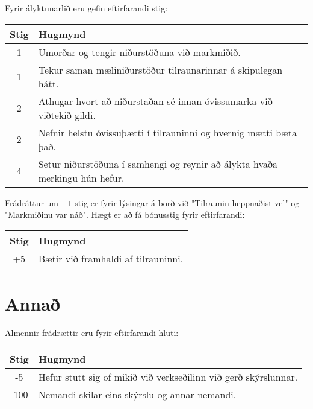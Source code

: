 \begin{tcolorbox}
Fyrir ályktunarlið eru gefin eftirfarandi stig:

\begin{table}[H]
    \centering
    \begin{tabular}{|c|l|}
    \hline
       \textbf{Stig}  & \textbf{Hugmynd}   \\ \hline \hline
        1  &  Umorðar og tengir niðurstöðuna við markmiðið. \\ \hline
        1  & Tekur saman mæliniðurstöður tilraunarinnar á skipulegan hátt. \\ \hline
        2  & Athugar hvort að niðurstaðan sé innan óvissumarka við viðtekið gildi. \\ \hline
        2  & Nefnir helstu óvissuþætti í tilrauninni og hvernig mætti bæta það. \\ \hline
        4 & Setur niðurstöðuna í samhengi og reynir að álykta hvaða merkingu hún hefur. \\ \hline
    \end{tabular}
\end{table}

Frádráttur um $-1$ stig er fyrir lýsingar á borð við "Tilraunin heppnaðist vel" og "Markmiðinu var náð". Hægt er að fá bónusstig fyrir eftirfarandi:

\begin{table}[H]
    \centering
    \begin{tabular}{|c|l|}
    \hline
       \textbf{Stig}  & \textbf{Hugmynd}   \\ \hline \hline
        +5  &  Bætir við framhaldi af tilrauninni. \\ \hline
    \end{tabular}
\end{table}

\section*{Annað}

Almennir frádrættir eru fyrir eftirfarandi hluti:

\begin{table}[H]
    \centering
    \begin{tabular}{|c|l|}
    \hline
       \textbf{Stig}  & \textbf{Hugmynd}   \\ \hline \hline
        -5  & Hefur stutt sig of mikið við verkseðilinn við gerð skýrslunnar. \\ \hline
        -100  & Nemandi skilar eins skýrslu og annar nemandi. \\ \hline
    \end{tabular}
\end{table}
\end{tcolorbox}


